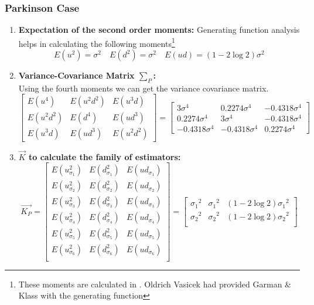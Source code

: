 \documentclass[12pt]{article}   	%
\begin{document}
\subsubsection{Parkinson Case}
\begin{enumerate}
\item \textbf{Expectation of the second order moments:}\newline
Generating function analysis helps in calculating the following moments\footnote{These moments are calculated in \citealp{garman1980}. Oldrich Vasicek had provided Garman \& Klass with the generating function}
$$ E(u^2 )=\sigma^2\quad  E(d^2 )=\sigma^2\quad  E(ud)=(1-2\log 2)\sigma{^2}  $$
\item \textbf{Variance-Covariance Matrix $\sum_{P} $:}\\
Using the fourth moments we can get the variance covariance matrix.
	$$  \begin{bmatrix}
			E(u^4 )&E(u^2 d^2 )&E(u^3 d)\\
			E(u^2 d^2 )&E(d^4 )&E({ud}^3 )\\
			E(u^3 d)&E({ud}^3 )&E(u^2 d^2 ) 
			\end{bmatrix}=
			\begin{bmatrix}
			3\sigma^4&0.2274\sigma^4&-0.4318\sigma^4\\
			0.2274\sigma^4&3\sigma^4&-0.4318\sigma^4\\
			-0.4318\sigma^4&-0.4318\sigma^4&0.2274\sigma^4 
			\end{bmatrix}
$$
\item\textbf{ $\vec{K}$ to calculate the family of estimators:}\\
$$\vec{K_P}=
\begin{bmatrix}
E(u_{\sigma_1}^2)& E(d_{\sigma_1}^2)&E(ud_{\sigma_1})\\
E(u_{\sigma_2}^2)& E(d_{\sigma_2}^2)&E(ud_{\sigma_2})\\
E(u_{\sigma_3}^2)& E(d_{\sigma_3}^2)&E(ud_{\sigma_3})\\
E(u_{\sigma_4}^2)& E(d_{\sigma_4}^2)&E(ud_{\sigma_4})\\
E(u_{\sigma_5}^2)& E(d_{\sigma_5}^2)&E(ud_{\sigma_5})\\
E(u_{\sigma_6}^2)& E(d_{\sigma_6}^2)&E(ud_{\sigma_6})\\
\end{bmatrix}
=\begin{bmatrix}
\sigma_1{^2} &\sigma_1{^2} & (1-2\log 2)\sigma_1{^2} \\
\sigma_2{^2} &\sigma_2{^2} & (1-2\log 2)\sigma_2{^2} \\

\end{bmatrix}$$
\end{enumerate}
\end{document}
